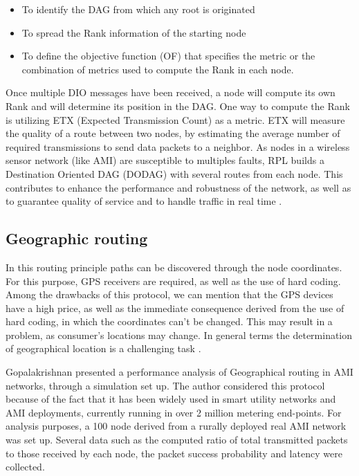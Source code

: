 \documentclass[11pt,draftclsnofoot,onecolumn]{IEEEtran}
\begin{document}
\begin{itemize}
	\item To identify the DAG from which any root is originated
	\item To spread the Rank information of the starting node
	\item To define the objective function (OF) that specifies the metric or the combination of metrics used to compute the Rank in each node.
\end{itemize}

Once multiple DIO messages have been received, a node will compute its own Rank and will determine its position in the DAG. One way to compute the Rank is utilizing ETX (Expected Transmission Count) as a metric. ETX will measure the quality of a route between two nodes, by estimating the average number of required transmissions to send data packets to a neighbor. As nodes in a wireless sensor network (like AMI) are susceptible to multiples faults, RPL builds a Destination Oriented DAG (DODAG) with several routes from each node. This contributes to enhance the performance and robustness of the network, as well as to guarantee quality of service and to handle traffic in real time  \cite{Pavkovic2011}.

\subsection{Geographic routing}\label{geographic}

In this routing principle paths can be discovered through the node coordinates. For this purpose, GPS receivers are required, as well as the use of hard coding. Among the drawbacks of this protocol, we can mention that the GPS devices have a high price, as well as the immediate consequence derived from the use of hard coding, in which the coordinates can’t be changed. This may result in a problem, as consumer’s locations may change. In general terms the determination of geographical location is a challenging task  \cite{Sabbah2014}. 

Gopalakrishnan  \cite{Iyer2011a} presented a performance analysis of Geographical routing in AMI networks, through a simulation set up.  The author considered this protocol because of the fact that it has been widely used in smart utility networks and AMI deployments, currently running in over 2 million metering end-points. For analysis purposes, a 100 node derived from a rurally deployed real AMI network was set up. Several data such as the computed ratio of total transmitted packets to those received by each node, the packet success probability and latency were collected. 
\end{document}
